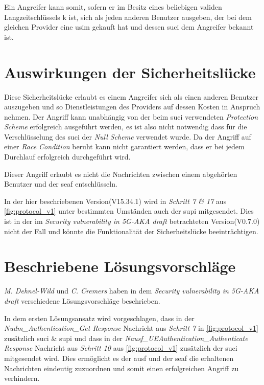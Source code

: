 Ein Angreifer kann somit, sofern er im Besitz eines beliebigen validen Langzeitschlüssels \gls{k} ist, sich als jeden anderen Benutzer ausgeben, der bei dem gleichen Provider eine \gls{usim} gekauft hat und dessen \gls{suci} dem Angreifer bekannt ist.


\section{Auswirkungen der Sicherheitslücke}

Diese Sicherheitslücke erlaubt es einem Angreifer sich als einen anderen Benutzer auszugeben und so Dienstleistungen des Providers auf dessen Kosten in Anspruch nehmen.
Der Angriff kann unabhängig von der beim \gls{suci} verwendeten \textit{Protection Scheme} erfolgreich ausgeführt werden, es ist also nicht notwendig dass für die Verschlüsselung des \gls{suci} der \textit{Null Scheme} verwendet wurde.
Da der Angriff auf einer \textit{Race Condition} beruht kann nicht garantiert werden, dass er bei jedem Durchlauf erfolgreich durchgeführt wird.

Dieser Angriff erlaubt es nicht die Nachrichten zwischen einem abgehörten Benutzer und der \gls{seaf} entschlüsseln.

In der hier beschriebenen Version(V15.34.1) wird in \textit{Schritt 7 \& 17} aus \cref{fig:protocol_v1} unter bestimmten Umständen auch der \gls{supi} mitgesendet.
Dies ist in der im \textit{Security vulnerability in 5G-AKA draft} betrachteten Version(V0.7.0) nicht der Fall und könnte die Funktionalität der Sicherheitslücke beeinträchtigen.


\section{Beschriebene Lösungsvorschläge}

\textit{M. Dehnel-Wild} und \textit{C. Cremers} haben in dem \textit{Security vulnerability in 5G-AKA draft} verschiedene Lösungsvorschläge beschrieben.

In dem ersten Lösungsansatz wird vorgeschlagen, dass in der \textit{Nudm\_Authentication\_Get Response} Nachricht aus \textit{Schritt 7} in \cref{fig:protocol_v1} zusätzlich \gls{suci} \& \gls{supi} und dass in der \textit{Nausf\_UEAuthentication\_Authenticate Response} Nachricht aus \textit{Schritt 10} aus \cref{fig:protocol_v1} zusätzlich der \gls{suci} mitgesendet wird.
Dies ermöglicht es der \gls{ausf} und der \gls{seaf} die erhaltenen Nachrichten eindeutig zuzuordnen und somit einen erfolgreichen Angriff zu verhindern.

